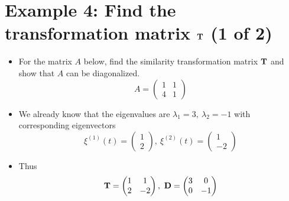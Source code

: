 \documentclass[11pt,a4paper]{article}
\begin{document}
	\section*{Example 4: Find the transformation matrix $\vb{T}$ (1 of 2)}
	\begin{itemize}
		\item For the matrix $A$ below, find the similarity transformation matrix $\vb{T}$ and show that $A$ can be diagonalized.
		$$
		A = 
		\begin{pmatrix}
			1 & 1\\
			4 & 1
		\end{pmatrix}
		$$
		\item We already know that the eigenvalues are $\lambda_1 = 3,\ \lambda_2 = -1$ with corresponding eigenvectors
		$$
		\xi^{(1)}(t) =
		\begin{pmatrix}
			1\\
			2
		\end{pmatrix},\ \xi^{(2)}(t) =
		\begin{pmatrix}
			1\\
			-2
		\end{pmatrix}
		$$
		\item Thus
		$$
		\vb{T} =
		\begin{pmatrix}
			1 & 1\\
			2 & -2
		\end{pmatrix},\ \vb{D} =
		\begin{pmatrix}
			3 & 0\\
			0 & -1
		\end{pmatrix}
		$$
	\end{itemize}
\end{document}
